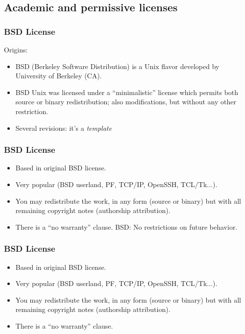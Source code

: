 \subsection{Academic and permissive licenses}

\begin{frame}
\frametitle{BSD License}

Origins:
\begin{itemize}
\item BSD (Berkeley Software Distribution) is a Unix flavor developed
  by University of Berkeley (CA).
\item BSD Unix was licensed under a ``minimalistic'' license which
  permits both source or binary redistribution; also modifications,
  but without any other restriction.
\item Several revisions: it's a \textit{template}
\end{itemize}

\end{frame}



\begin{frame}
\frametitle{BSD License}

\begin{itemize}
\item Based in original BSD license.
\item Very popular (BSD userland, PF, TCP/IP, OpenSSH, TCL/Tk...).
\item You may redistribute the work, in any form (source or binary)
  but with all remaining copyright notes (authorship attribution).
\item There is a ``no warranty'' clause. 
BSD: No restrictions on future behavior. 
\end{itemize}

\end{frame}


\begin{frame}
\frametitle{BSD License}

\begin{itemize}
\item Based in original BSD license.
\item Very popular (BSD userland, PF, TCP/IP, OpenSSH, TCL/Tk...).
\item You may redistribute the work, in any form (source or binary)
  but with all remaining copyright notes (authorship attribution).
\item There is a ``no warranty'' clause. 
\end{itemize}

\end{frame}

